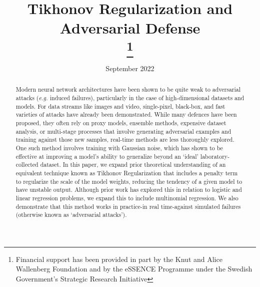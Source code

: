 \documentclass[conference]{IEEEtran}
\date{September 2022}
\begin{document}
\title{Tikhonov Regularization and Adversarial Defense\\

\thanks{Financial support has been provided in part by the Knut and Alice Wallenberg Foundation and by the eSSENCE Programme under the Swedish Government’s Strategic Research Initiative}
}

\author{
\and
{}
\and
{}
}


\maketitle


\begin{abstract}
    Modern neural network architectures have been shown to be quite weak to adversarial attacks (\textit{e.g.} induced failures), particularly in the case of high-dimensional datasets and models. For data streams like images and video, single-pixel, black-box, and fast varieties of attacks have already been demonstrated. While many defences have been proposed, they often rely on proxy models, ensemble methods, expensive dataset analysis, or multi-stage processes that involve generating adversarial examples and training against those new samples, real-time methods are less thoroughly explored. One such method involves training with Gaussian noise, which has shown to be effective at improving a model's ability to generalize beyond an `ideal' laboratory-collected dataset. In this paper, we expand prior theoretical understanding of an equivalent technique known as Tikhonov Regularization that includes a penalty term to regularize the scale of the model weights, reducing the tendency of a given model to have unstable output. Although prior work has explored this in relation to logistic and linear regression problems, we expand this to include multinomial regression. We also demonstrate that this method works in practice-in real time-against simulated failures (otherwise known as `adversarial attacks').
\end{abstract}
\end{document}

